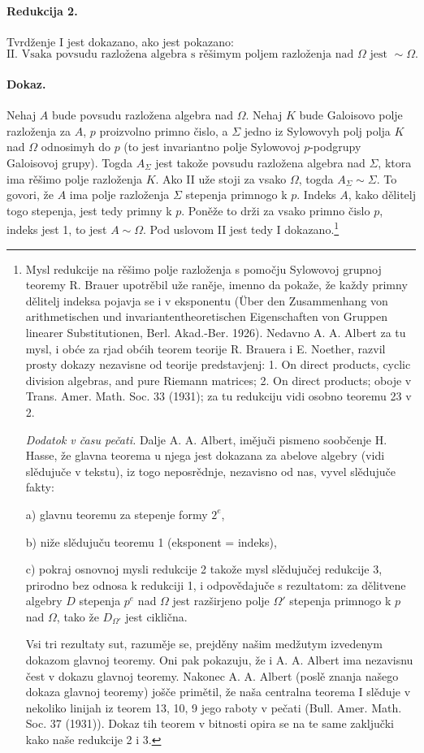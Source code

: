 \documentclass[11pt]{article}
\newcommand{\foreign}[1]{#1}
\begin{document}
\paragraph{Redukcija 2.}
Tvrdženje I jest dokazano, ako jest pokazano:
\[
\text{II. Vsaka povsudu razložena algebra s rěšimym poljem razloženja nad }\Omega\text{ jest }\sim\Omega .
\]

\paragraph{Dokaz.}
Nehaj \(A\) bude povsudu razložena algebra nad \(\Omega\). Nehaj \(K\) bude Galoisovo polje razloženja za \(A\), \(p\) proizvolno primno čislo, a \(\Sigma\) jedno iz Sylowovyh polj polja \(K\) nad \(\Omega\) odnosimyh do \(p\) (to jest invariantno polje Sylowovoj \(p\)-podgrupy Galoisovoj grupy). Togda \(A_{\Sigma}\) jest takože povsudu razložena algebra nad \(\Sigma\), ktora ima rěšimo polje razloženja \(K\). Ako II uže stoji za vsako \(\Omega\), togda \(A_{\Sigma}\sim \Sigma\). To govori, že \(A\) ima polje razloženja \(\Sigma\) stepenja primnogo k \(p\). Indeks \(A\), kako dělitelj togo stepenja, jest tedy primny k \(p\). Poněže to drži za vsako primno čislo \(p\), indeks jest 1, to jest \(A\sim\Omega\). Pod uslovom II jest tedy I dokazano.\footnote{Mysl redukcije na rěšimo polje razloženja s pomočju Sylowovoj grupnoj teoremy R. Brauer upotrěbil uže raněje, imenno da pokaže, že každy primny dělitelj indeksa pojavja se i v eksponentu (\foreign{Über den Zusammenhang von arithmetischen und invariantentheoretischen Eigenschaften von Gruppen linearer Substitutionen, Berl. Akad.-Ber. 1926}). Nedavno A. A. Albert za tu mysl, i obće za rjad obćih teorem teorije R. Brauera i E. Noether, razvil prosty dokazy nezavisne od teorije predstavjenj: \foreign{1. On direct products, cyclic division algebras, and pure Riemann matrices; 2. On direct products;} oboje v \foreign{Trans. Amer. Math. Soc. 33 (1931)}; za tu redukciju vidi osobno teoremu 23 v 2.

\emph{Dodatok v času pečati.} Dalje A. A. Albert, imějuči pismeno soobčenje H. Hasse, že glavna teorema u njega jest dokazana za abelove algebry (vidi slědujuče v tekstu), iz togo neposrědnje, nezavisno od nas, vyvel slědujuče fakty:

a) glavnu teoremu za stepenje formy \(2^e\),

b) niže slědujuču teoremu 1 (eksponent = indeks),

c) pokraj osnovnoj mysli redukcije 2 takože mysl slědujučej redukcije 3, prirodno bez odnosa k redukciji 1, i odpovědajuče s rezultatom: za dělitvene algebry \(D\) stepenja \(p^e\) nad \(\Omega\) jest razširjeno polje \(\Omega'\) stepenja primnogo k \(p\) nad \(\Omega\), tako že \(D_{\Omega'}\) jest ciklična.

Vsi tri rezultaty sut, razuměje se, prejděny našim medžutym izvedenym dokazom glavnoj teoremy. Oni pak pokazuju, že i A. A. Albert ima nezavisnu čest v dokazu glavnoj teoremy. Nakonec A. A. Albert (poslě znanja našego dokaza glavnoj teoremy) jošče primětil, že naša centralna teorema I slěduje v nekoliko linijah iz teorem 13, 10, 9 jego raboty v pečati (\foreign{Bull. Amer. Math. Soc. 37 (1931)}). Dokaz tih teorem v bitnosti opira se na te same zaključki kako naše redukcije 2 i 3.}
\end{document}

